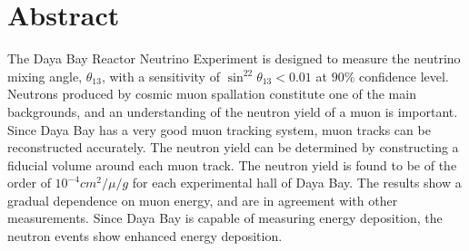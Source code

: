 \chapter*{\centering Abstract}
The Daya Bay Reactor Neutrino Experiment is designed to measure the neutrino mixing angle, $\theta_{13}$, with a sensitivity of $\sin^22\theta_{13}<0.01$ at $90\%$ confidence level. Neutrons produced by cosmic muon spallation constitute one of the main backgrounds, and an understanding of the neutron yield of a muon is important. Since Daya Bay has a very good muon tracking system, muon tracks can be reconstructed accurately. The neutron yield can be determined by constructing a fiducial volume around each muon track. The neutron yield is found to be of the order of $10^{-4}cm^2/\mu/g$ for each experimental hall of Daya Bay. The results show a gradual dependence on muon energy, and are in agreement with other measurements. Since Daya Bay is capable of measuring energy deposition, the neutron events show enhanced energy deposition.
